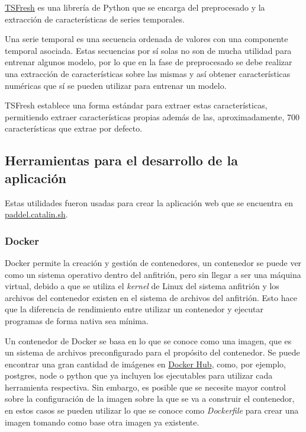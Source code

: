 \href{https://github.com/blue-yonder/tsfresh}{TSFresh} \cite{christ2018time} es
una librería de Python que se encarga del preprocesado y la extracción de
características de series temporales.

Una serie temporal es una secuencia ordenada de valores con una componente
temporal asociada. Estas secuencias por sí solas no son de mucha utilidad para
entrenar algunos modelo, por lo que en la fase de preprocesado se debe realizar
una extracción de características sobre las mismas y así obtener características
numéricas que sí se pueden utilizar para entrenar un modelo.

TSFresh establece una forma estándar para extraer estas características,
permitiendo extraer características propias además de las, aproximadamente, 700
características que extrae por defecto.

\subsection{Herramientas para el desarrollo de la aplicación}

Estas utilidades fueron usadas para crear la aplicación web que se encuentra en
\href{https://paddel.catalin.sh}{paddel.catalin.sh}.

\subsubsection{Docker}

Docker permite la creación y gestión de contenedores, un contenedor se puede ver
como un sistema operativo dentro del anfitrión, pero sin llegar a ser una
máquina virtual, debido a que se utiliza el \textit{kernel} de Linux del sistema
anfitrión y los archivos del contenedor existen en el sistema de archivos del
anfitrión. Esto hace que la diferencia de rendimiento entre utilizar un
contenedor y ejecutar programas de forma nativa sea mínima.

Un contenedor de Docker se basa en lo que se conoce como una imagen, que es un
sistema de archivos preconfigurado para el propósito del contenedor. Se puede
encontrar una gran cantidad de imágenes en \href{https://hub.docker.com/}{Docker
Hub}, como, por ejemplo, postgres, node o python que ya incluyen los ejecutables
para utilizar cada herramienta respectiva. Sin embargo, es posible que se
necesite mayor control sobre la configuración de la imagen sobre la que se va a
construir el contenedor, en estos casos se pueden utilizar lo que se conoce como
\textit{Dockerfile} para crear una imagen tomando como base otra imagen ya
existente.

